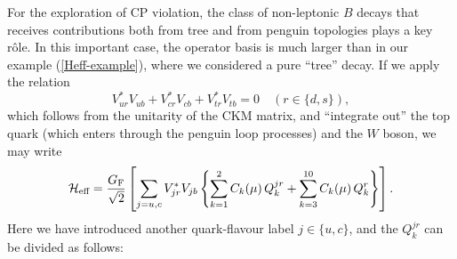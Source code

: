 \documentclass[12pt]{article}
\begin{document}
For the exploration of CP violation, the class of non-leptonic $B$ decays 
that receives contributions both from tree and from penguin topologies plays 
a key r\^ole. In this important case, the operator basis is much larger 
than in our example (\ref{Heff-example}), where we considered a pure 
``tree'' decay. If we apply the relation
\begin{equation}\label{CKM-UT-Rel}
V_{ur}^\ast V_{ub}+V_{cr}^\ast V_{cb}+V_{tr}^\ast V_{tb}=0
\quad (r\in\{d,s\}),
\end{equation}
which follows from the unitarity of the CKM matrix, and ``integrate out''
the top quark (which enters through the penguin loop processes) and 
the $W$ boson, we may write 
\begin{equation}\label{e4}
{\cal H}_{\mbox{{\scriptsize eff}}}=\frac{G_{\mbox{{\scriptsize 
F}}}}{\sqrt{2}}\left[\sum\limits_{j=u,c}V_{jr}^\ast V_{jb}\left\{
\sum\limits_{k=1}^2C_k(\mu)\,Q_k^{jr}
+\sum\limits_{k=3}^{10}C_k(\mu)\,Q_k^{r}\right\}\right].
\end{equation}
Here we have introduced another quark-flavour label $j\in\{u,c\}$,
and the $Q_k^{jr}$ can be divided as follows:
\end{document}
